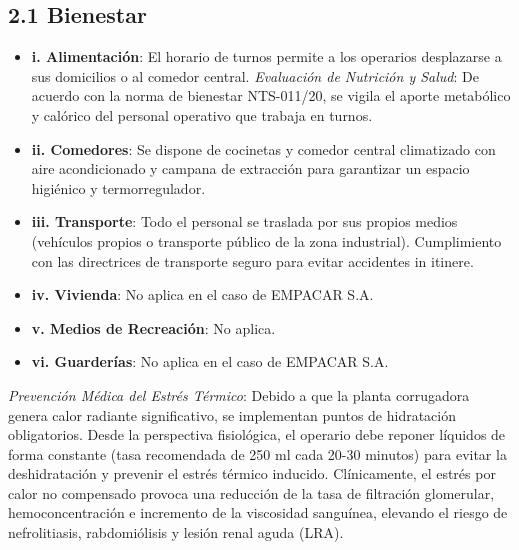\documentclass[11pt, letterpaper]{article}
\begin{document}
\subsection{2.1 Bienestar}
\begin{itemize}
    \item \textbf{i. Alimentación}: El horario de turnos permite a los operarios desplazarse a sus domicilios o al comedor central. \textit{Evaluación de Nutrición y Salud}: De acuerdo con la norma de bienestar NTS-011/20, se vigila el aporte metabólico y calórico del personal operativo que trabaja en turnos.
    \item \textbf{ii. Comedores}: Se dispone de cocinetas y comedor central climatizado con aire acondicionado y campana de extracción para garantizar un espacio higiénico y termorregulador.
    \item \textbf{iii. Transporte}: Todo el personal se traslada por sus propios medios (vehículos propios o transporte público de la zona industrial). Cumplimiento con las directrices de transporte seguro para evitar accidentes in itinere.
    \item \textbf{iv. Vivienda}: No aplica en el caso de EMPACAR S.A.
    \item \textbf{v. Medios de Recreación}: No aplica.
    \item \textbf{vi. Guarderías}: No aplica en el caso de EMPACAR S.A.
\end{itemize}
\textit{Prevención Médica del Estrés Térmico}: Debido a que la planta corrugadora genera calor radiante significativo, se implementan puntos de hidratación obligatorios. Desde la perspectiva fisiológica, el operario debe reponer líquidos de forma constante (tasa recomendada de 250 ml cada 20-30 minutos) para evitar la deshidratación y prevenir el estrés térmico inducido. Clínicamente, el estrés por calor no compensado provoca una reducción de la tasa de filtración glomerular, hemoconcentración e incremento de la viscosidad sanguínea, elevando el riesgo de nefrolitiasis, rabdomiólisis y lesión renal aguda (LRA).
\end{document}
